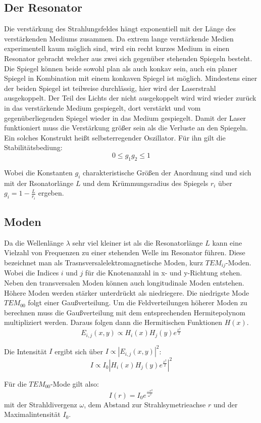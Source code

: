 \subsection{Der Resonator}
\label{sec:Resonator}
Die verstärkung des Strahlungsfeldes hängt exponentiell mit der Länge des verstärkenden Mediums zusammen.
Da extrem lange verstärkende Medien experimentell kaum möglich sind, wird ein recht kurzes Medium in einen 
Resonator gebracht welcher aus zwei sich gegenüber stehenden Spiegeln besteht. Die Spiegel können beide 
sowohl plan als auch konkav sein, auch ein planer Spiegel in Kombination mit einem konkaven Spiegel ist möglich.
Mindestens einer der beiden Spiegel ist teilweise durchlässig, hier wird der Laserstrahl ausgekoppelt.
Der Teil des Lichts der nicht ausgekoppelt wird wird wieder zurück in das verstärkende Medium gespiegelt,
dort verstärkt und vom gegenüberliegenden Spiegel wieder in das Medium gespiegelt. Damit der Laser funktioniert
muss die Verstärkung größer sein als die Verluste an den Spiegeln. Ein solches Konstrukt heißt selbsterregender
Oszillator. Für ihn gilt die Stabilitätsbediung:
\begin{equation}
    0 \leq g_1g_2 \leq 1
\end{equation}

Wobei die Konstanten $g_i$ charakteristische Größen der Anordnung sind und sich mit der Rsonatorlänge $L$ und dem
Krümmungsradius des Spiegels $r_i$ über $g_i=1-\frac{L}{r_i}$ ergeben.

\subsection{Moden}
\label{sec:Moden}
Da die Wellenlänge $\lambda$ sehr viel kleiner ist als die Resonatorlänge $L$ kann eine Vielzahl von Frequenzen
zu einer stehenden Welle im Resonator führen. Diese bezeichnet man als Trasnsversalelektromagnetische Moden,
kurz $TEM_{ij}$-Moden. Wobei die Indices $i$ und $j$ für die Knotenanzahl in x- und y-Richtung stehen.
Neben den transversalen Moden können auch longitudinale Moden entstehen.
Höhere Moden werden stärker unterdrückt als niedriegere. Die niedrigste Mode $TEM_{00}$ folgt einer Gaußverteilung.
Um die Feldverteilungen höherer Moden zu berechnen muss die Gaußverteilung mit dem entsprechenden
Hermitepolynom multipliziert werden. Daraus folgen dann die Hermitischen Funktionen $H(x)$.
\begin{equation}
    E_{i,j}(x,y)\propto H_i(x)H_j(y)e^{\frac{x^2}{2}}
\end{equation}

Die Intensität $I$ ergibt sich über $I\propto |E_{i,j}(x,y)|^2$:
\begin{equation}
    I\propto I_0|H_i(x)H_j(y)e^{\frac{x^2}{2}}|^2
\end{equation}

Für die $TEM_{00}$-Mode gilt also:
\begin{equation}
    I(r)=I_0e^{\frac{-r^2}{\omega^2}}
\end{equation}
mit der Strahldivergenz $\omega$, dem Abstand zur Strahlsymetrieachse $r$ und der Maximalintensität $I_0$.

